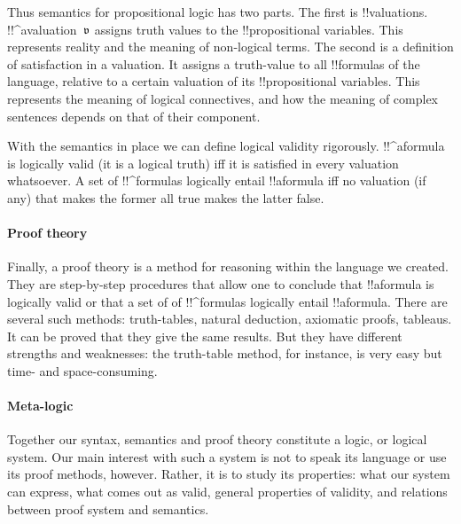 \documentclass[../../../include/open-logic-section]{subfiles}
\begin{document}
Thus semantics for propositional logic has two parts. The first is !!{valuation}s. !!^a{valuation}~$\pAssign{v}$ assigns truth values to the !!{propositional variable}s. This represents reality and the meaning of non-logical terms. The second is a definition of satisfaction in a valuation. It assigns a truth-value to all !!{formula}s of the language, relative to a certain valuation of its !!{propositional variable}s. This represents the meaning of logical connectives, and how the meaning of complex sentences depends on that of their component. 

With the semantics in place we can define logical validity rigorously. !!^a{formula} is logically valid (it is a logical truth) iff it is satisfied in every valuation whatsoever. A set of !!^{formula}s logically entail !!a{formula} iff no valuation (if any) that makes the former all true makes the latter false. 

\paragraph{Proof theory}

Finally, a proof theory is a method for reasoning within the language we created. They are step-by-step procedures that allow one to conclude that !!a{formula} is logically valid or that a set of of !!^{formula}s logically entail !!a{formula}. There are several such methods: truth-tables, natural deduction, axiomatic proofs, tableaus. It can be proved that they give the same results. But they have different strengths and weaknesses: the truth-table method, for instance, is very easy but time- and space-consuming. 

\paragraph{Meta-logic}
 Together our syntax, semantics and proof theory constitute a logic, or logical system. Our main interest with such a system is not to speak its language or use its proof methods, however. Rather, it is to study its properties: what our system can express, what comes out as valid, general properties of validity, and relations between proof system and semantics. 
\end{document}
